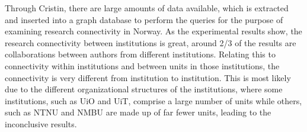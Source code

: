 Through Cristin, there are large amounts of data available, which is extracted and inserted into a graph database to perform the queries for the purpose of examining research connectivity in Norway.
As the experimental results show, the research connectivity between institutions is great, around 2/3 of the results are collaborations between authors from different institutions.
Relating this to connectivity within institutions and between units in those institutions, the connectivity is very different from institution to institution.
This is most likely due to the different organizational structures of the institutions, where some institutions, such as UiO and UiT, comprise a large number of units while others, such as NTNU and NMBU are made up of far fewer units, leading to the inconclusive results.
